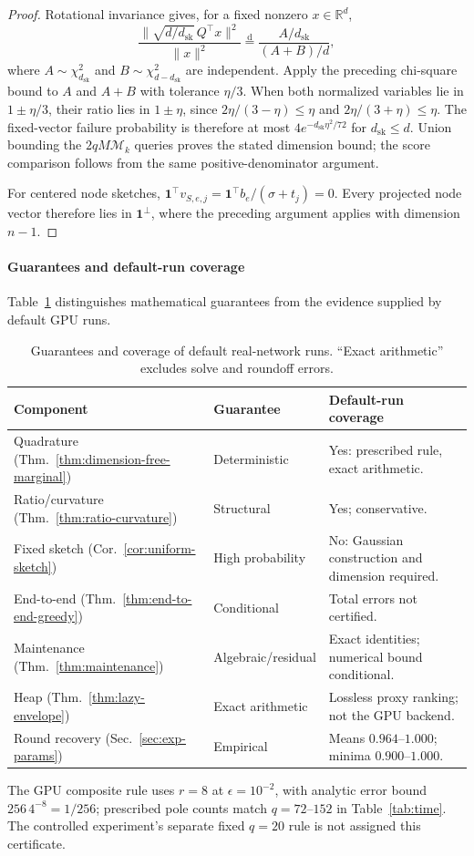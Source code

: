 \documentclass[conference]{IEEEtran}
\theoremstyle{definition}
\newcommand{\dsk}{d_{\mathrm{sk}}}
\begin{document}
\begin{proof}
Rotational invariance gives, for a fixed nonzero $x\in\mathbb R^d$,
\[
\frac{\|\sqrt{d/{\dsk}}\,Q^\top x\|^2}{\|x\|^2}
\stackrel{\mathrm d}{=}\frac{A/{\dsk}}{(A+B)/d},
\]
where $A\sim\chi_{\dsk}^2$ and $B\sim\chi_{d-{\dsk}}^2$ are
independent. Apply the preceding chi-square bound to $A$
and $A+B$ with tolerance $\eta/3$.
When both normalized variables lie in $1\pm\eta/3$, their
ratio lies in $1\pm\eta$, since
$2\eta/(3-\eta)\le\eta$ and
$2\eta/(3+\eta)\le\eta$.
The fixed-vector failure probability is therefore at most
$4e^{-{\dsk}\eta^2/72}$ for ${\dsk}\le d$.
Union bounding the $2qM\mathcal M_k$ queries proves the stated
dimension bound; the score comparison follows from the same
positive-denominator argument.

For centered node sketches,
$\mathbf1^\top v_{S,e,j}=
\mathbf1^\top b_e/(\sigma+t_j)=0$.
Every projected node vector therefore lies in
$\mathbf1^\perp$, where the preceding argument applies with
dimension $n-1$.
\end{proof}
\paragraph{Guarantees and default-run coverage}
Table~\ref{tab:guarantee-scope} distinguishes mathematical guarantees
from the evidence supplied by default GPU runs.
\begin{table}[t]
\centering
\caption{Guarantees and coverage of default real-network runs.
``Exact arithmetic'' excludes solve and roundoff errors.}
\label{tab:guarantee-scope}
\footnotesize
\begin{tabular}{@{}p{}p{}p{}@{}}
\toprule
Component & Guarantee & Default-run coverage\\
\midrule
Quadrature (Thm.~\ref{thm:dimension-free-marginal}) & Deterministic & Yes: prescribed rule, exact arithmetic.\\
Ratio/curvature (Thm.~\ref{thm:ratio-curvature}) & Structural & Yes; conservative.\\
Fixed sketch (Cor.~\ref{cor:uniform-sketch}) & High probability & No: Gaussian construction and dimension required.\\
End-to-end (Thm.~\ref{thm:end-to-end-greedy}) & Conditional & Total errors not certified.\\
Maintenance (Thm.~\ref{thm:maintenance}) & Algebraic/residual & Exact identities; numerical bound conditional.\\
Heap (Thm.~\ref{thm:lazy-envelope}) & Exact arithmetic & Lossless proxy ranking; not the GPU backend.\\
Round recovery (Sec.~\ref{sec:exp-params}) & Empirical & Means $0.964$--$1.000$; minima $0.900$--$1.000$.\\
\bottomrule
\end{tabular}
\end{table}
The GPU composite rule uses $r=8$ at $\epsilon=10^{-2}$, with
analytic error bound $256\,4^{-8}=1/256$; prescribed pole counts
match $q=72$--$152$ in Table~\ref{tab:time}. The controlled experiment's separate
fixed $q=20$ rule is not assigned this certificate.
\end{document}
